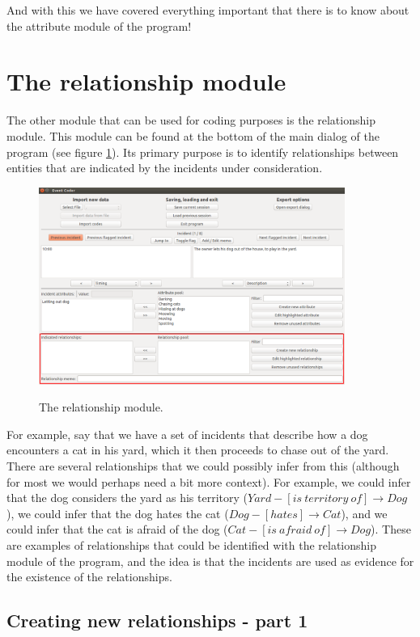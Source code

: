 \documentclass{memoir}
\begin{document}
And with this we have covered everything important that there is to know about the attribute module of the program!

\section{The relationship module}
\label{sec:relationshipmodule}

The other module that can be used for coding purposes is the relationship module. This module can be found at the bottom of the main dialog of the program (see figure \ref{fig:relationshipmodule}). Its primary purpose is to identify relationships between entities that are indicated by the incidents under consideration. 
\begin{figure}[h!]
  \centering
  \caption{The relationship module.}
  \includegraphics[width=100mm]{Screenshot_14.pdf}
  \label{fig:relationshipmodule}
\end{figure}

For example, say that we have a set of incidents that describe how a dog encounters a cat in his yard, which it then proceeds to chase out of the yard. There are several relationships that we could possibly infer from this (although for most we would perhaps need a bit more context). For example, we could infer that the dog considers the yard as his territory (\(Yard-[is\  territory\ of]\rightarrow Dog\)), we could infer that the dog hates the cat (\(Dog-[hates]\rightarrow Cat\)), and we could infer that the cat is afraid of the dog (\(Cat-[is\ afraid\ of]\rightarrow Dog\)). These are examples of relationships that could be identified with the relationship module of the program, and the idea is that the incidents are used as evidence for the existence of the relationships.

\subsection{Creating new relationships - part 1}
\label{sec:creatingnewrelationships1}
\end{document}

